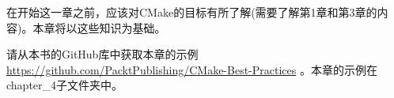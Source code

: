 在开始这一章之前，应该对CMake的目标有所了解(需要了解第1章和第3章的内容)。本章将以这些知识为基础。

请从本书的GitHub库中获取本章的示例\url{https://github.com/PacktPublishing/CMake-Best-Practices} 。本章的示例在chapter\_4子文件夹中。
